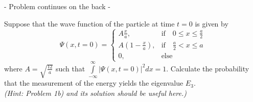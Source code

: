 \documentclass[11pt]{article}
\begin{document}
\begin{itemize}
%
\centerline{- Problem continues on the back -}
\newpage
%
Suppose that the wave function of the particle at time $t=0$ is given by
\begin{displaymath}
\Psi(x,t=0) =
\begin{cases}
A\frac{x}{a}, &\mbox{if}\quad 0\le x\le \frac{a}{2}\\
A\left(1-\frac{x}{a}\right), &\mbox{if}\quad \frac{a}{2} < x \le a\\
0, &\mbox{else}
\end{cases}
\end{displaymath}
where $A = \sqrt{\frac{12}{a}}$ such that $\int\limits_{-\infty}^{\infty} |\Psi(x,t=0)|^2 dx = 1$. Calculate the probability that the measurement of the energy yields the eigenvalue $E_3$.\\
{\it (Hint: Problem 1b) and its solution should be useful here.)}
%
\vspace*{0.25cm}
%


\end{itemize}
\end{document}
